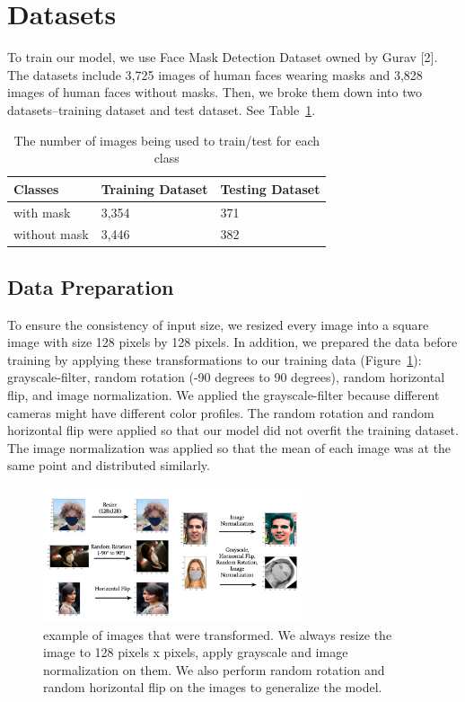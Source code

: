 \section{Datasets}

To train our model, we use Face Mask Detection Dataset owned by Gurav [2].
The datasets include 3,725 images of human faces wearing masks and 3,828 images of human faces without masks.
Then, we broke them down into two datasets–training dataset and test dataset. See Table~\ref{table:num-images-table}.

\begin{table}
  \caption{The number of images being used to train/test for each class}
  \label{table:num-images-table}
  \centering
  \begin{tabular}{lll}
    \toprule
    Classes       & Training Dataset & Testing Dataset \\
    \midrule
    with mask     & 3,354            & 371 \\
    without mask  & 3,446            & 382 \\
    \bottomrule
  \end{tabular}
\end{table}

\subsection{Data Preparation}
To ensure the consistency of input size, we resized every image into a square image with size 128 pixels by 128 pixels. In addition, we prepared the data before training by applying these transformations to our training data (Figure~\ref{fig:image-transformation}):
grayscale-filter, random rotation (-90 degrees to 90 degrees), random horizontal flip, and image normalization.
We applied the grayscale-filter because different cameras might have different color profiles.
The random rotation and random horizontal flip were applied so that our model did not overfit the training dataset.
The image normalization was applied so that the mean of each image was at the same point and distributed similarly.

\begin{figure}
  \caption{
    example of images that were transformed. We always resize the image to 128 pixels x pixels, apply grayscale and image normalization on them. We also perform random rotation and random horizontal flip on the images to generalize the model.
  }
  \label{fig:image-transformation}
  \centering
  \includegraphics[height=150px]{figures/image-transformation.png}
\end{figure}